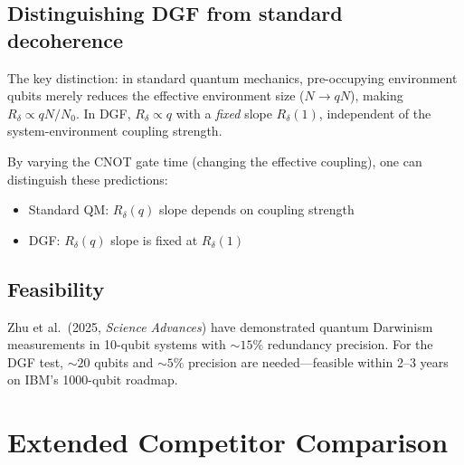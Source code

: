 \documentclass[12pt,a4paper]{article}
\begin{document}
\subsection{Distinguishing DGF from standard decoherence}

The key distinction: in standard quantum mechanics, pre-occupying environment qubits merely reduces the effective environment size ($N\to qN$), making $R_\delta\propto qN/N_0$. In DGF, $R_\delta\propto q$ with a {\it fixed} slope $R_\delta(1)$, independent of the system-environment coupling strength.

By varying the CNOT gate time (changing the effective coupling), one can distinguish these predictions:
\begin{itemize}
\item Standard QM: $R_\delta(q)$ slope depends on coupling strength
\item DGF: $R_\delta(q)$ slope is fixed at $R_\delta(1)$
\end{itemize}

\subsection{Feasibility}

Zhu et al.\ (2025, {\it Science Advances}) have demonstrated quantum Darwinism measurements in 10-qubit systems with $\sim15\%$ redundancy precision. For the DGF test, $\sim20$ qubits and $\sim5\%$ precision are needed---feasible within 2--3 years on IBM's 1000-qubit roadmap.

\section{Extended Competitor Comparison}
\end{document}
